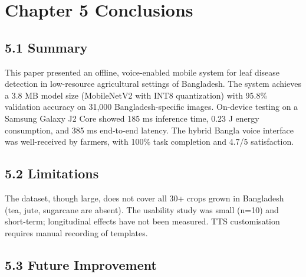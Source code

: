 \documentclass[12pt,letterpaper]{report}
\begin{document}
\chapter*{Chapter 5 Conclusions}

\section*{5.1 Summary}

This paper presented an offline, voice-enabled mobile system for leaf disease detection in low-resource agricultural settings of Bangladesh. The system achieves a 3.8 MB model size (MobileNetV2 with INT8 quantization) with 95.8\% validation accuracy on 31,000 Bangladesh-specific images. On-device testing on a Samsung Galaxy J2 Core showed 185 ms inference time, 0.23 J energy consumption, and 385 ms end-to-end latency. The hybrid Bangla voice interface was well-received by farmers, with 100\% task completion and 4.7/5 satisfaction.

\section*{5.2 Limitations}

The dataset, though large, does not cover all 30+ crops grown in Bangladesh (tea, jute, sugarcane are absent). The usability study was small (n=10) and short-term; longitudinal effects have not been measured. TTS customisation requires manual recording of templates.

\section*{5.3 Future Improvement}
\end{document}
